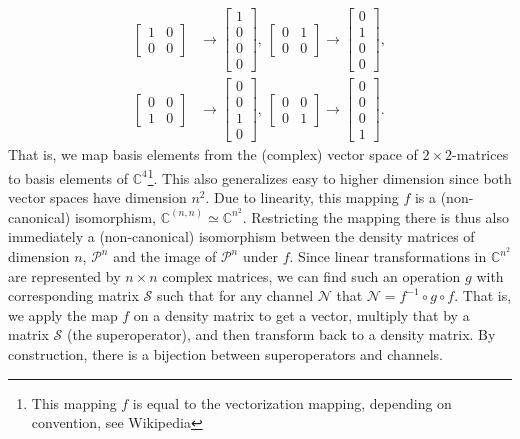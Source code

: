 \documentclass[twoside]{article}
\newcommand{\N}{\mathcal N}
\begin{document}
\begin{align}
\begin{bmatrix}
1 & 0\\
0 & 0
\end{bmatrix} & \rightarrow \begin{bmatrix}
1\\
0\\
0\\
0
\end{bmatrix},~\begin{bmatrix}
0 & 1\\
0 & 0
\end{bmatrix}  \rightarrow \begin{bmatrix}
0\\
1\\
0\\
0
\end{bmatrix},\\
\begin{bmatrix}
0 & 0\\
1 & 0
\end{bmatrix} & \rightarrow \begin{bmatrix}
0\\
0\\
1\\
0
\end{bmatrix},~\begin{bmatrix}
0 & 0\\
0 & 1
\end{bmatrix}  \rightarrow \begin{bmatrix}
0\\
0\\
0\\
1
\end{bmatrix}.
\end{align}
That is, we map basis elements from the (complex) vector space of $2\times 2$-matrices to basis elements of $\mathbb{C}^{4}$\footnote{This mapping $f$ is equal to the vectorization mapping, depending on convention, see Wikipedia}. This also generalizes easy to higher dimension since both vector spaces have dimension $n^2$. Due to linearity, this mapping $f$ is a (non-canonical) isomorphism, $\mathbb{C}^{(n,n)}\simeq \mathbb{C}^{n^2}$. Restricting the mapping there is thus also immediately a (non-canonical) isomorphism between the density matrices of dimension $n$, $\mathcal{P}^n$ and the image of $\mathcal{P}^n$ under $f$. Since linear transformations in $\mathbb{C}^{n^2}$ are represented by $n\times n$ complex matrices, we can find such an operation $g$ with corresponding matrix $\mathcal{S}$ such that for any channel $\N$ that $\N = f^{-1}\circ g \circ f$. That is, we apply the map $f$ on a density matrix to get a vector, multiply that by a matrix $\mathcal{S}$ (the superoperator), and then transform back to a density matrix. By construction, there is a bijection between superoperators and channels.\\
\end{document}
